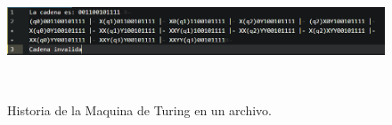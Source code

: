 	\begin{figure}[H]
		\begin{center}
			\includegraphics[width=\linewidth, height=4cm]{img/turing-automatico-archivo.png}
			\caption{Historia de la Maquina de Turing en un archivo.}
			\label{fig:turing4}
		\end{center}
	\end{figure}

